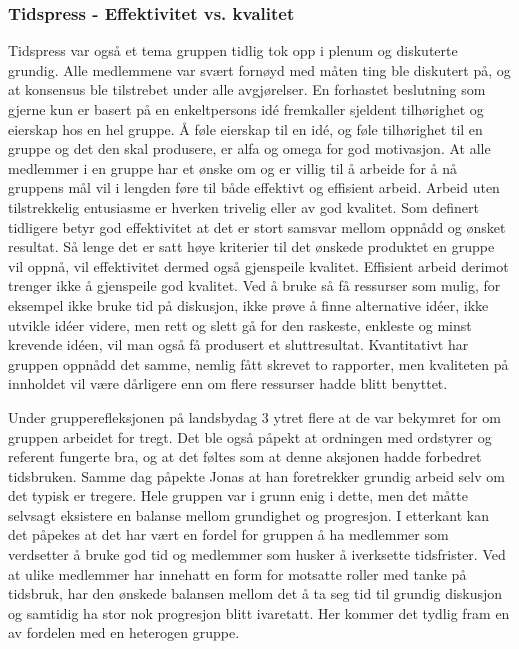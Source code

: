 \subsubsection{Tidspress - Effektivitet vs. kvalitet}
Tidspress var også et tema gruppen tidlig tok opp i plenum og diskuterte grundig.
Alle medlemmene var svært fornøyd med måten ting ble diskutert på, og at konsensus ble tilstrebet under alle avgjørelser.
En forhastet beslutning som gjerne kun er basert på en enkeltpersons id\'{e} fremkaller sjeldent tilhørighet og eierskap hos en hel gruppe.
Å føle eierskap til en id\'{e}, og føle tilhørighet til en gruppe og det den skal produsere, er alfa og omega for god motivasjon.
At alle medlemmer i en gruppe har et ønske om og er villig til å arbeide for å nå gruppens mål vil i lengden føre til både effektivt og effisient arbeid.
Arbeid uten tilstrekkelig entusiasme er hverken trivelig eller av god kvalitet.
Som definert tidligere betyr god effektivitet at det er stort samsvar mellom oppnådd og ønsket resultat.
Så lenge det er satt høye kriterier til det ønskede produktet en gruppe vil oppnå, vil effektivitet dermed også gjenspeile kvalitet.
Effisient arbeid derimot trenger ikke å gjenspeile god kvalitet.
Ved å bruke så få ressurser som mulig, for eksempel ikke bruke tid på diskusjon, ikke prøve å finne alternative id\'{e}er, ikke utvikle id\'{e}er videre, men rett og slett gå for den raskeste, enkleste og minst krevende id\'{e}en, vil man også få produsert et sluttresultat.
Kvantitativt har gruppen oppnådd det samme, nemlig fått skrevet to rapporter, men kvaliteten på innholdet vil være dårligere enn om flere ressurser hadde blitt benyttet.

Under grupperefleksjonen på landsbydag 3 ytret flere at de var bekymret for om gruppen arbeidet for tregt.
Det ble også påpekt at ordningen med ordstyrer og referent fungerte bra, og at det føltes som at denne aksjonen hadde forbedret tidsbruken.
Samme dag påpekte Jonas at han foretrekker grundig arbeid selv om det typisk er tregere.
Hele gruppen var i grunn enig i dette, men det måtte selvsagt eksistere en balanse mellom grundighet og progresjon.
I etterkant kan det påpekes at det har vært en fordel for gruppen å ha medlemmer som verdsetter å bruke god tid og medlemmer som husker å iverksette tidsfrister.
Ved at ulike medlemmer har innehatt en form for motsatte roller med tanke på tidsbruk, har den ønskede balansen mellom det å ta seg tid til grundig diskusjon og samtidig ha stor nok progresjon blitt ivaretatt. 
Her kommer det tydlig fram en av fordelen med en heterogen gruppe.

